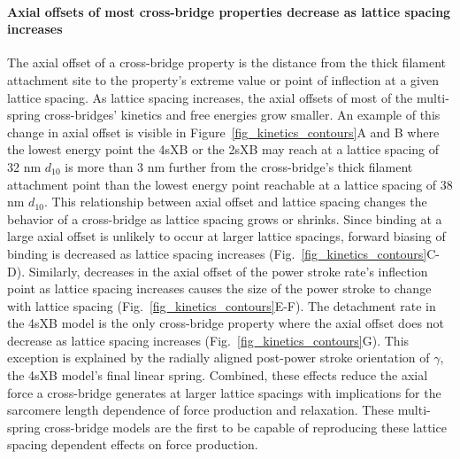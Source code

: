 \documentclass[11pt,titlepage]{article}
\begin{document}
\paragraph{Axial offsets of most cross-bridge properties decrease as lattice spacing increases} %
The axial offset of a cross-bridge property is the distance from the thick filament attachment site to the property's extreme value or point of inflection at a given lattice spacing. 
As lattice spacing increases, the axial offsets of most of the multi-spring cross-bridges' kinetics and free energies grow smaller.
An example of this change in axial offset is visible in Figure~\ref{fig_kinetics_contours}A and B where the lowest energy point the 4sXB or the 2sXB may reach at a lattice spacing of 32 nm $d_{10}$ is more than 3 nm further from the cross-bridge's thick filament attachment point than the lowest energy point reachable at a lattice spacing of 38 nm $d_{10}$. 
This relationship between axial offset and lattice spacing changes the behavior of a cross-bridge as lattice spacing grows or shrinks.
Since binding at a large axial offset is unlikely to occur at larger lattice spacings, forward biasing of binding is decreased as lattice spacing increases (Fig.~\ref{fig_kinetics_contours}C-D). 
Similarly, decreases in the axial offset of the power stroke rate's inflection point as lattice spacing increases causes the size of the power stroke to change with lattice spacing (Fig.~\ref{fig_kinetics_contours}E-F).
The detachment rate in the 4sXB model is the only cross-bridge property where the axial offset does not decrease as lattice spacing increases (Fig.~\ref{fig_kinetics_contours}G). 
This exception is explained by the radially aligned post-power stroke orientation of $\gamma$, the 4sXB model's final linear spring. 
Combined, these effects reduce the axial force a cross-bridge generates at larger lattice spacings with implications for the sarcomere length dependence of force production and relaxation. 
These multi-spring cross-bridge models are the first to be capable of reproducing these lattice spacing dependent effects on force production.
\end{document}
